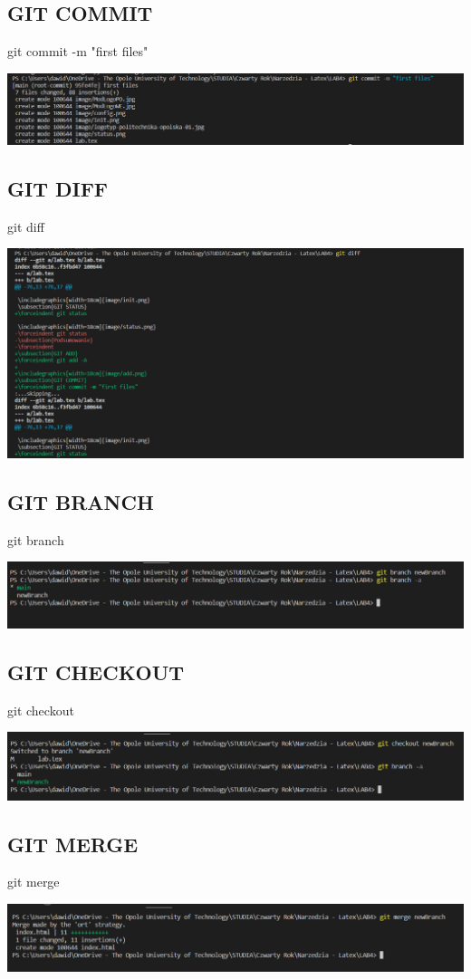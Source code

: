 \documentclass{article} %
\newcommand{\forceindent}{\leavevmode{\parindent=1cm\indent}} %
\begin{document}
\subsection{GIT COMMIT}
\forceindent git commit -m "first files"

\includegraphics[width=18cm]{image/commit.png}
\subsection{GIT DIFF}
\forceindent git diff

\includegraphics[width=18cm]{image/diff.png}
\subsection{GIT BRANCH}
\forceindent git branch

\includegraphics[width=18cm]{image/branch.png}
\subsection{GIT CHECKOUT}
\forceindent git checkout

\includegraphics[width=18cm]{image/checkout.png}
\subsection{GIT MERGE}
\forceindent git merge

\includegraphics[width=18cm]{image/merge.png}
\end{document}
